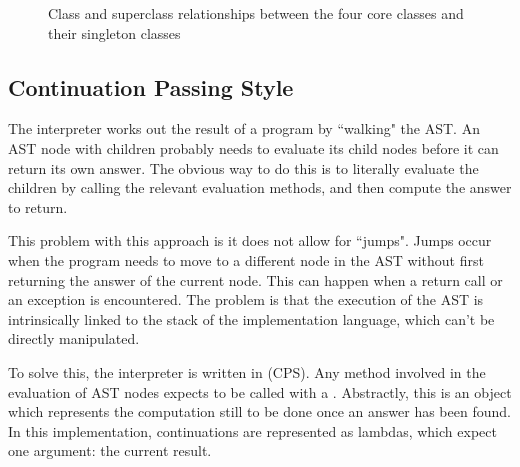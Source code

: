 \begin{figure}
\begin{center}
\caption{Class and superclass relationships between the four core classes and their singleton classes}
\label{fig:core_relationships}
\end{center}
\end{figure}

\subsection{Continuation Passing Style}

The interpreter works out the result of a program by ``walking" the AST. An AST node with children probably needs to evaluate its child nodes before it can return its own answer. The obvious way to do this is to literally evaluate the children by calling the relevant evaluation methods, and then compute the answer to return.

This problem with this approach is it does not allow for ``jumps". Jumps occur when the program needs to move to a different node in the AST without first returning the answer of the current node. This can happen when a return call or an exception is encountered. The problem is that the execution of the AST is intrinsically linked to the stack of the implementation language, which can't be directly manipulated.

To solve this, the interpreter is written in  (CPS). Any method involved in the evaluation of AST nodes expects to be called with a . Abstractly, this is an object which represents the computation still to be done once an answer has been found. In this implementation, continuations are represented as lambdas, which expect one argument: the current result.

